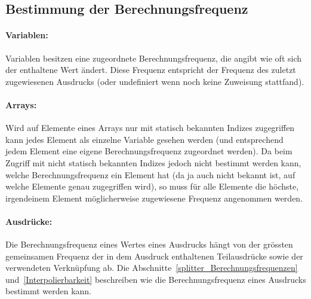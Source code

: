 \documentclass[twoside,a4paper,fleqn,12pt]{book}
\begin{document}
\subsection{Bestimmung der Berechnungsfrequenz}

\paragraph{Variablen:} Variablen besitzen eine zugeordnete Berechnungsfrequenz, die angibt wie oft sich der enthaltene Wert ändert.
Diese Frequenz entspricht der Frequenz des zuletzt zugewiesenen Ausdrucks (oder undefiniert wenn noch keine Zuweisung stattfand).

\paragraph{Arrays:} %
Wird auf Elemente eines Arrays nur mit statisch bekannten Indizes zugegriffen kann jedes Element als einzelne Variable gesehen werden
(und entsprechend jedem Element eine eigene Berechnungsfrequenz zugeordnet werden).
Da beim Zugriff mit nicht statisch bekannten Indizes jedoch nicht bestimmt werden kann, welche Berechnungsfrequenz ein
Element hat (da ja auch nicht bekannt ist, auf welche Elemente genau zugegriffen wird), so muss für alle Elemente die höchste, irgendeinem Element möglicherweise
zugewiesene Frequenz angenommen werden.

\paragraph{Ausdrücke:} Die Berechnungsfrequenz eines Wertes eines Ausdrucks hängt von der grössten gemeinsamen Frequenz
der in dem Ausdruck enthaltenen Teilausdrücke sowie der verwendeten Verknüpfung ab.
Die Abschnitte~\ref{splitter_Berechnungsfrequenzen} und~\ref{Interpolierbarkeit} beschreiben wie die Berechnungsfrequenz eines Ausdrucks bestimmt werden kann.
\end{document}
